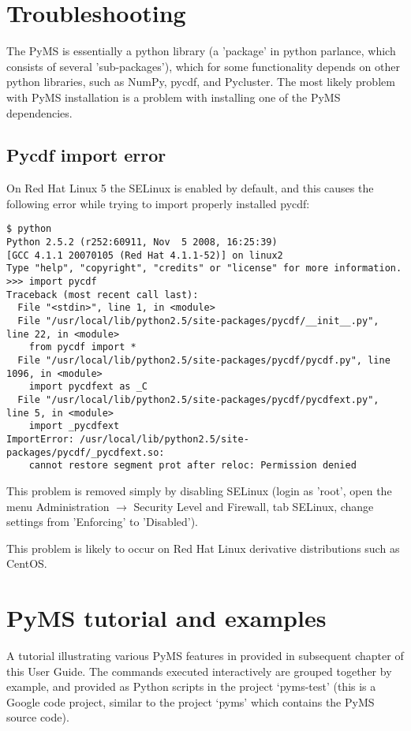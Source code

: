 \section{Troubleshooting}

The PyMS is essentially a python library (a 'package' in python parlance, which
consists of several 'sub-packages'), which for some functionality depends on
other python libraries, such as NumPy, pycdf, and Pycluster. The most likely
problem with PyMS installation is a problem with installing one of the PyMS
dependencies.

\subsection{Pycdf import error}

On Red Hat Linux 5 the SELinux is enabled by default, and this causes the
following error while trying to import properly installed pycdf:

\begin{verbatim}
$ python
Python 2.5.2 (r252:60911, Nov  5 2008, 16:25:39)
[GCC 4.1.1 20070105 (Red Hat 4.1.1-52)] on linux2
Type "help", "copyright", "credits" or "license" for more information.
>>> import pycdf
Traceback (most recent call last):
  File "<stdin>", line 1, in <module>
  File "/usr/local/lib/python2.5/site-packages/pycdf/__init__.py", line 22, in <module>
    from pycdf import *
  File "/usr/local/lib/python2.5/site-packages/pycdf/pycdf.py", line 1096, in <module>
    import pycdfext as _C
  File "/usr/local/lib/python2.5/site-packages/pycdf/pycdfext.py", line 5, in <module>
    import _pycdfext
ImportError: /usr/local/lib/python2.5/site-packages/pycdf/_pycdfext.so:
    cannot restore segment prot after reloc: Permission denied
\end{verbatim}

This problem is removed simply by disabling SELinux (login as 'root', open the menu
Administration $\rightarrow$ Security Level and Firewall, tab SELinux, change settings
from 'Enforcing' to 'Disabled').

This problem is likely to occur on Red Hat Linux derivative distributions such as CentOS.

\section{PyMS tutorial and examples}

A tutorial illustrating various PyMS features in provided in subsequent chapter
of this User Guide. The commands executed interactively are grouped together
by example, and provided as Python scripts in the project `pyms-test' (this is
a Google code project, similar to the project `pyms' which contains the PyMS
source code).

